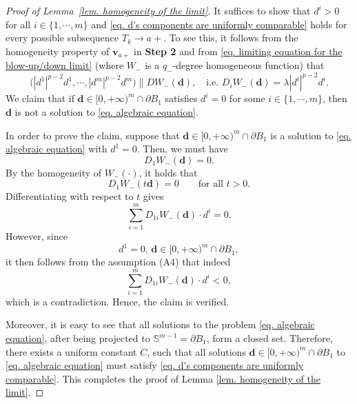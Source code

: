 \documentclass[11pt,twoside,reqno]{amsart}
\newcounter{assu}
\numberwithin{equation}{section}
\begin{document}
\begin{proof}[Proof of Lemma~\ref{lem. homogeneity of the limit}]
It suffices to show that $d^{i}>0$ for all $i\in\{1,\cdots,m\}$ and \eqref{eq. d's components are uniformly comparable} holds for every possible subsequence $T_{k}\to a+$. To see this, it follows from the homogeneity property of $\mathbf{v}_{a+}$ in \textbf{Step 2} and from \eqref{eq. limiting equation for the blow-up/down limit} (where $W_{-}$ is a $q_{-}$-degree homogeneous function) that
\begin{equation}\label{eq. algebraic equation}
    \Big(|d^{1}|^{p-2}d^{1},\cdots,|d^{m}|^{p-2}d^{m}\Big)\parallel DW_{-}(\mathbf{d}),\quad\mbox{i.e. }D_{i}W_{-}(\mathbf{d})=\lambda|d^{i}|^{p-2}d^{i}.
\end{equation}
We claim that if $\mathbf{d}\in[0,+\infty)^{m}\cap\partial B_{1}$ satisfies $d^{i}=0$ for some $i\in\{1,\cdots,m\}$, then $\mathbf{d}$ is not a solution to \eqref{eq. algebraic equation}.

In order to prove the claim, suppose that $\mathbf{d}\in[0,+\infty)^{m}\cap\partial B_{1}$ is a solution to \eqref{eq. algebraic equation} with $d^{1}=0$. Then, we must have $$D_{1}W_{-}(\mathbf{d})=0.$$ By the homogeneity of $W_{-}(\cdot)$, it holds that \[
D_1W_{-}(t\mathbf d)=0
\qquad\text{for all }t>0.
\] 
Differentiating with respect to $t$ gives
\begin{equation*}
    \sum_{i=1}^{m}D_{1i}W_{-}(\mathbf{d})\cdot d^{i}=0.
\end{equation*}
However, since $$d^{1}=0, \,\mathbf{d}\in[0,+\infty)^{m}\cap\partial B_{1},$$ it then follows from the assumption (A4) that indeed $$\displaystyle\sum_{i=1}^{m}D_{1i}W_{-}(\mathbf{d})\cdot d^{i}<0,$$ which is a contradiction. Hence, the claim is verified.

Moreover, it is easy to see that all solutions to the problem \eqref{eq. algebraic equation}, after being projected to $\mathbb{S}^{m-1}=\partial B_{1}$, form a closed set. Therefore, there exists a uniform constant $C$, such that all solutions $\mathbf{d}\in[0,+\infty)^{m}\cap\partial B_{1}$ to \eqref{eq. algebraic equation} must satisfy \eqref{eq. d's components are uniformly comparable}. This completes the proof of Lemma \ref{lem. homogeneity of the limit}.
\end{proof}
\end{document}

